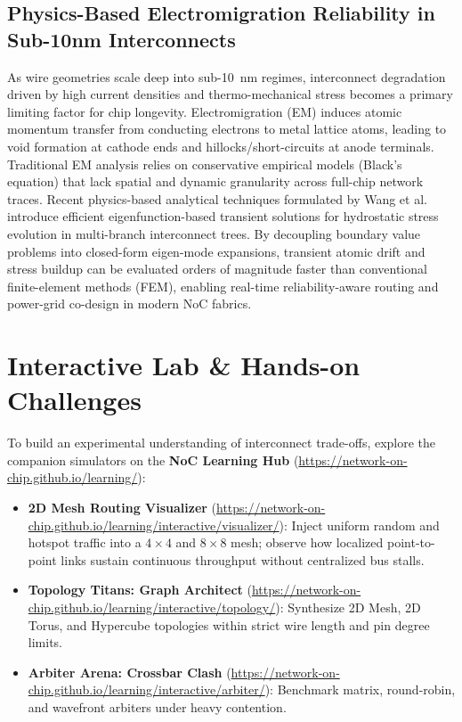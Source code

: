 \subsection{Physics-Based Electromigration Reliability in Sub-10nm Interconnects}
\label{sec:ch1_electromigration}
As wire geometries scale deep into sub-10~nm regimes, interconnect degradation driven by high current densities and thermo-mechanical stress becomes a primary limiting factor for chip longevity. Electromigration (EM) induces atomic momentum transfer from conducting electrons to metal lattice atoms, leading to void formation at cathode ends and hillocks/short-circuits at anode terminals. Traditional EM analysis relies on conservative empirical models (Black's equation) that lack spatial and dynamic granularity across full-chip network traces. Recent physics-based analytical techniques formulated by Wang et al.~\cite{Wang2021EM} introduce efficient eigenfunction-based transient solutions for hydrostatic stress evolution in multi-branch interconnect trees. By decoupling boundary value problems into closed-form eigen-mode expansions, transient atomic drift and stress buildup can be evaluated orders of magnitude faster than conventional finite-element methods (FEM), enabling real-time reliability-aware routing and power-grid co-design in modern NoC fabrics.

\section{Interactive Lab \& Hands-on Challenges}
\label{sec:ch1_interactive}

To build an experimental understanding of interconnect trade-offs, explore the companion simulators on the \textbf{NoC Learning Hub} (\url{https://network-on-chip.github.io/learning/}):
\begin{itemize}
    \item \textbf{2D Mesh Routing Visualizer} (\url{https://network-on-chip.github.io/learning/interactive/visualizer/}): Inject uniform random and hotspot traffic into a $4 \times 4$ and $8 \times 8$ mesh; observe how localized point-to-point links sustain continuous throughput without centralized bus stalls.
    \item \textbf{Topology Titans: Graph Architect} (\url{https://network-on-chip.github.io/learning/interactive/topology/}): Synthesize 2D Mesh, 2D Torus, and Hypercube topologies within strict wire length and pin degree limits.
    \item \textbf{Arbiter Arena: Crossbar Clash} (\url{https://network-on-chip.github.io/learning/interactive/arbiter/}): Benchmark matrix, round-robin, and wavefront arbiters under heavy contention.
\end{itemize}

